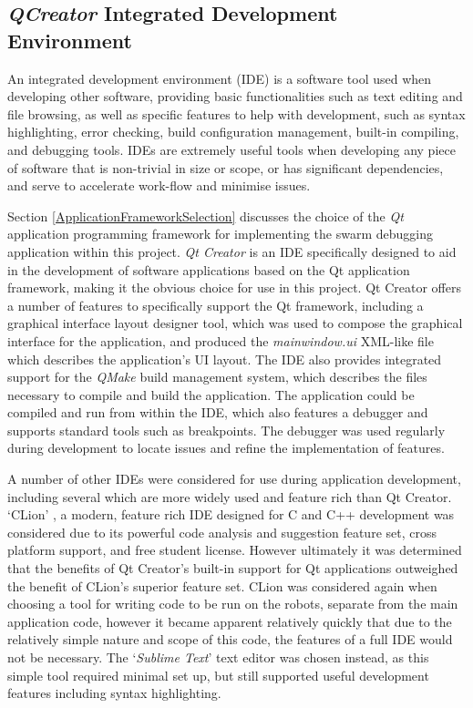 \subsection{\textit{QCreator} Integrated Development Environment}
An integrated development environment (IDE) is a software tool used when developing other software, providing basic functionalities such as text editing and file browsing, as well as specific features to help with development, such as syntax highlighting, error checking, build configuration management, built-in compiling, and debugging tools. IDEs are extremely useful tools when developing any piece of software that is non-trivial in size or scope, or has significant dependencies, and serve to accelerate work-flow and minimise issues.

Section \ref{ApplicationFrameworkSelection} discusses the choice of the \textit{Qt} application programming framework for implementing the swarm debugging application within this project. \textit{Qt Creator} \cite{QTCreator} is an IDE specifically designed to aid in the development of software applications based on the Qt application framework, making it the obvious choice for use in this project. Qt Creator offers a number of features to specifically support the Qt framework, including a graphical interface layout designer tool, which was used to compose the graphical interface for the application, and produced the \textit{mainwindow.ui} XML-like file which describes the application's UI layout. The IDE also provides integrated support for the \textit{QMake} build management system, which describes the files necessary to compile and build the application. The application could be compiled and run from within the IDE, which also features a debugger and supports standard tools such as breakpoints. The debugger was used regularly during development to locate issues and refine the implementation of features.

A number of other IDEs were considered for use during application development, including several which are more widely used and feature rich than Qt Creator. `CLion' \cite{CLion}, a modern, feature rich IDE designed for C and C++ development was considered due to its powerful code analysis and suggestion feature set, cross platform support, and free student license. However ultimately it was determined that the benefits of Qt Creator's built-in support for Qt applications outweighed the benefit of CLion's superior feature set. CLion was considered again when choosing a tool for writing code to be run on the robots, separate from the main application code, however it became apparent relatively quickly that due to the relatively simple nature and scope of this code, the features of a full IDE would not be necessary. The `\textit{Sublime Text}' text editor \cite{SublimeText} was chosen instead, as this simple tool required minimal set up, but still supported useful development features including syntax highlighting.

